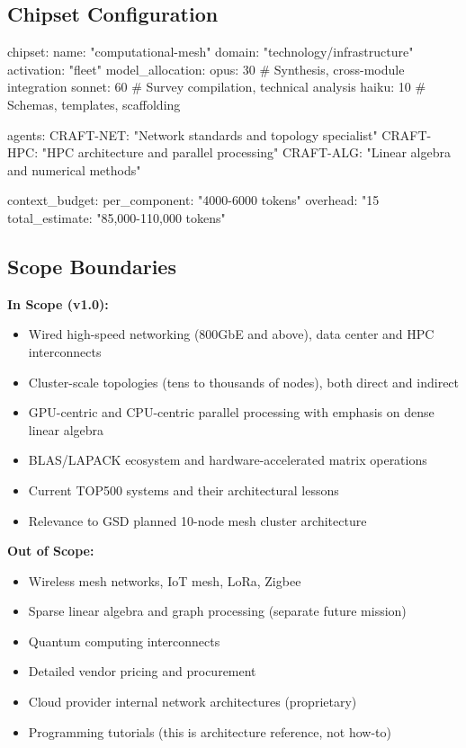 \documentclass[11pt,letterpaper]{article}
\begin{document}
\subsection{Chipset Configuration}

\begin{asciibox}
chipset:
  name: "computational-mesh"
  domain: "technology/infrastructure"
  activation: "fleet"
  model_allocation:
    opus: 30    # Synthesis, cross-module integration
    sonnet: 60  # Survey compilation, technical analysis
    haiku: 10   # Schemas, templates, scaffolding

  agents:
    CRAFT-NET: "Network standards and topology specialist"
    CRAFT-HPC: "HPC architecture and parallel processing"
    CRAFT-ALG: "Linear algebra and numerical methods"

  context_budget:
    per_component: "4000-6000 tokens"
    overhead: "15%
    total_estimate: "85,000-110,000 tokens"
\end{asciibox}

\subsection{Scope Boundaries}

\textbf{In Scope (v1.0):}
\begin{itemize}[leftmargin=2em]
\item Wired high-speed networking (800GbE and above), data center and HPC interconnects
\item Cluster-scale topologies (tens to thousands of nodes), both direct and indirect
\item GPU-centric and CPU-centric parallel processing with emphasis on dense linear algebra
\item BLAS/LAPACK ecosystem and hardware-accelerated matrix operations
\item Current TOP500 systems and their architectural lessons
\item Relevance to GSD planned 10-node mesh cluster architecture
\end{itemize}

\textbf{Out of Scope:}
\begin{itemize}[leftmargin=2em]
\item Wireless mesh networks, IoT mesh, LoRa, Zigbee
\item Sparse linear algebra and graph processing (separate future mission)
\item Quantum computing interconnects
\item Detailed vendor pricing and procurement
\item Cloud provider internal network architectures (proprietary)
\item Programming tutorials (this is architecture reference, not how-to)
\end{itemize}
\end{document}
